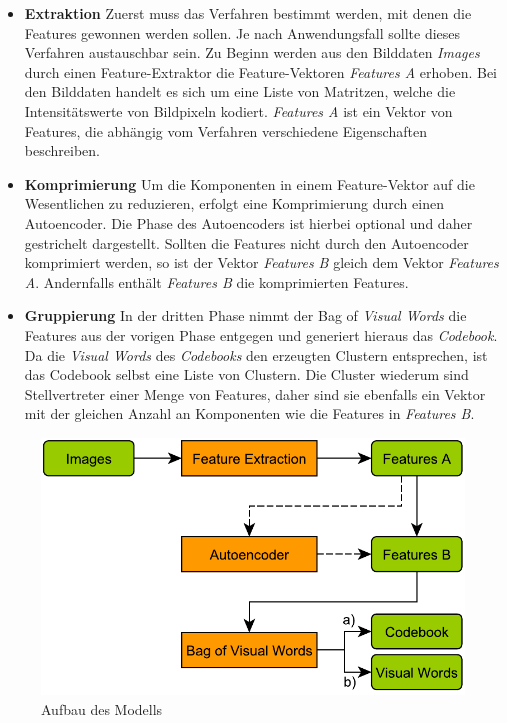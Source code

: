 \begin{itemize}
	\item \textbf{Extraktion} Zuerst muss das Verfahren bestimmt werden, mit denen die Features gewonnen werden sollen. Je nach Anwendungsfall sollte dieses Verfahren austauschbar sein. Zu Beginn werden aus den Bilddaten \textit{Images} durch einen Feature-Extraktor die Feature-Vektoren \textit{Features A} erhoben. Bei den Bilddaten handelt es sich um eine Liste von Matritzen, welche die Intensitätswerte von Bildpixeln kodiert. \textit{Features A} ist ein Vektor von Features, die abhängig vom Verfahren verschiedene Eigenschaften beschreiben.
	\item \textbf{Komprimierung} Um die Komponenten in einem Feature-Vektor auf die Wesentlichen zu reduzieren, erfolgt eine Komprimierung durch einen Autoencoder. Die Phase des Autoencoders ist hierbei optional und daher gestrichelt dargestellt. Sollten die Features nicht durch den Autoencoder komprimiert werden, so ist der Vektor \textit{Features B} gleich dem Vektor \textit{Features A}. Andernfalls enthält \textit{Features B} die komprimierten Features.
	\item \textbf{Gruppierung} In der dritten Phase nimmt der Bag of \textit{Visual Words} die Features aus der vorigen Phase entgegen und generiert hieraus das \textit{Codebook}. Da die \textit{Visual Words} des \textit{Codebooks} den erzeugten Clustern entsprechen, ist das Codebook selbst eine Liste von Clustern. Die Cluster wiederum sind Stellvertreter einer Menge von Features, daher sind sie ebenfalls ein Vektor mit der gleichen Anzahl an Komponenten wie die Features in \textit{Features B}.
\end{itemize} 

\begin{figure}
	\centering
	\includegraphics[scale=0.85]{images/model.pdf}
	\caption{Aufbau des Modells}
	\label{img:model}
\end{figure}

